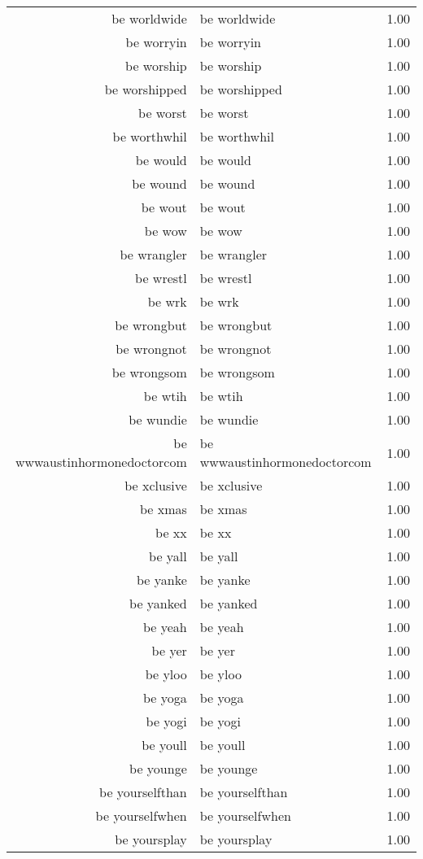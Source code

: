 \begin{table}[ht]
\begin{tabular}{rlr}
  be worldwide & be worldwide & 1.00 \\ 
  be worryin & be worryin & 1.00 \\ 
  be worship & be worship & 1.00 \\ 
  be worshipped & be worshipped & 1.00 \\ 
  be worst & be worst & 1.00 \\ 
  be worthwhil & be worthwhil & 1.00 \\ 
  be would & be would & 1.00 \\ 
  be wound & be wound & 1.00 \\ 
  be wout & be wout & 1.00 \\ 
  be wow & be wow & 1.00 \\ 
  be wrangler & be wrangler & 1.00 \\ 
  be wrestl & be wrestl & 1.00 \\ 
  be wrk & be wrk & 1.00 \\ 
  be wrongbut & be wrongbut & 1.00 \\ 
  be wrongnot & be wrongnot & 1.00 \\ 
  be wrongsom & be wrongsom & 1.00 \\ 
  be wtih & be wtih & 1.00 \\ 
  be wundie & be wundie & 1.00 \\ 
  be wwwaustinhormonedoctorcom & be wwwaustinhormonedoctorcom & 1.00 \\ 
  be xclusive & be xclusive & 1.00 \\ 
  be xmas & be xmas & 1.00 \\ 
  be xx & be xx & 1.00 \\ 
  be yall & be yall & 1.00 \\ 
  be yanke & be yanke & 1.00 \\ 
  be yanked & be yanked & 1.00 \\ 
  be yeah & be yeah & 1.00 \\ 
  be yer & be yer & 1.00 \\ 
  be yloo & be yloo & 1.00 \\ 
  be yoga & be yoga & 1.00 \\ 
  be yogi & be yogi & 1.00 \\ 
  be youll & be youll & 1.00 \\ 
  be younge & be younge & 1.00 \\ 
  be yourselfthan & be yourselfthan & 1.00 \\ 
  be yourselfwhen & be yourselfwhen & 1.00 \\ 
  be yoursplay & be yoursplay & 1.00 \\ 

\end{tabular}
\end{table}
